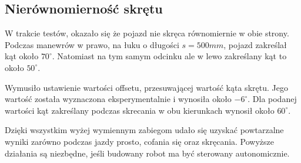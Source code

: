         \subsection{Nierównomierność skrętu}
        \label{subsec:nierownomiernosc_skretu}
            W trakcie testów, okazało się że pojazd nie skręca równomiernie w obie strony.
%
            Podczas manewrów w prawo, na łuku o długości $s = 500mm$, pojazd zakreślał kąt około $70^\circ$.
            Natomiast na tym samym odcinku ale w lewo zakreślany kąt to około $50^\circ$.

            Wymusiło ustawienie wartości offsetu, przesuwającej wartość kąta skrętu.
            Jego wartość została wyznaczona eksperymentalnie i wynosiła około $-6^\circ$.
            Dla podanej wartości kąt zakreślany podczas skrecania w obu kierunkach wynosił około $60^\circ$.



    Dzięki wszystkim wyżej wymiennym zabiegom udało się uzyskać powtarzalne wyniki zarówno podczas jazdy prosto, cofania się oraz skręcania.
    Powyższe działania są niezbędne, jeśli budowany robot ma być sterowany autonomicznie.

